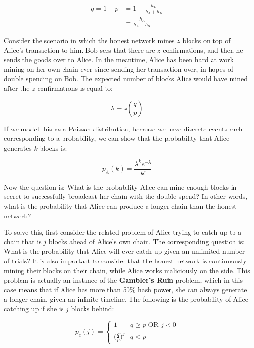 \documentclass[full.tex]{subfiles}
\begin{document}
   \begin{equation*}
       \begin{split}
           q = 1-p &= 1 - \frac{h_H}{h_A + h_H} \\
           &= \frac{h_A}{h_A + h_H}
       \end{split}
   \end{equation*}
   
   Consider the scenario in which the honest network mines $z$ blocks on top of Alice's transaction to him. Bob sees that there are $z$ confirmations, and then he sends the goods over to Alice. In the meantime, Alice has been hard at work mining on her own chain ever since sending her transaction over, in hopes of double spending on Bob. The expected number of blocks Alice would have mined after the $z$ confirmations is equal to:
   
   $$\lambda = z(\frac{q}{p})$$
   
   If we model this as a Poisson distribution, because we have discrete events each corresponding to a probability, we can show that the probability that Alice generates $k$ blocks is:
   
   $$p_A(k) = \frac{\lambda^k e^{-\lambda}}{k!}$$
   
   Now the question is: What is the probability Alice can mine enough blocks in secret to successfully broadcast her chain with the double spend? In other words, what is the probability that Alice can produce a longer chain than the honest network? 
   
   To solve this, first consider the related problem of Alice trying to catch up to a chain that is $j$ blocks ahead of Alice's own chain. The corresponding question is: What is the probability that Alice will ever catch up given an unlimited number of trials? It is also important to consider that the honest network is continuously mining their blocks on their chain, while Alice works maliciously on the side. This problem is actually an instance of the \textbf{Gambler's Ruin} problem, which in this case means that if Alice has more than 50\% hash power, she can always generate a longer chain, given an infinite timeline. The following is the probability of Alice catching up if she is $j$ blocks behind: 
   
   \[ p_c(j) = \begin{cases} 
      1 & q \geq p \text{ OR } j < 0 \\
      \big(\frac{q}{p}\big)^j & q < p
   \end{cases}
   \]
   
\end{document}
